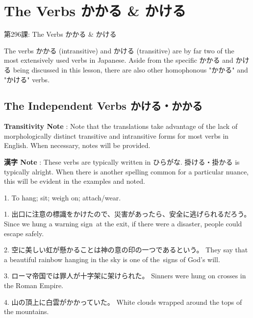     
\chapter{The Verbs かかる \& かける}

\begin{center}
\begin{Large}
第296課: The Verbs かかる \& かける 
\end{Large}
\end{center}
 
\par{ The verbs かかる (intransitive) and かける (transitive) are by far two of the most extensively used verbs in Japanese. Aside from the specific かかる and かける being discussed in this lesson, there are also other homophonous "かかる" and "かける" verbs. }
      
\section{The Independent Verbs かける・かかる}
 
\par{\textbf{Transitivity Note }: Note that the translations take advantage of the lack of morphologically distinct transitive and intransitive forms for most verbs in English. When necessary, notes will be provided. }

\par{\textbf{漢字 Note }: These verbs are typically written in ひらがな. 掛ける・掛かる is typically alright. When there is another spelling common for a particular nuance, this will be evident in the examples and noted. }

\par{1. To hang; sit; weigh on; attach\slash wear. }

\par{1. 出口に注意の標識をかけたので、災害があったら、安全に逃げられるだろう。 \hfill\break
Since we hung a warning sign at the exit, if there were a disaster, people could escape safely. }

\par{2. 空に美しい虹が懸かることは神の意の印の一つであるという。 \hfill\break
They say that a beautiful rainbow hanging in the sky is one of the signs of God's will. }

\par{3. ローマ帝国では罪人が十字架に架けられた。 \hfill\break
Sinners were hung on crosses in the Roman Empire. }

\par{4. 山の頂上に白雲がかかっていた。 \hfill\break
White clouds wrapped around the tops of the mountains. }

